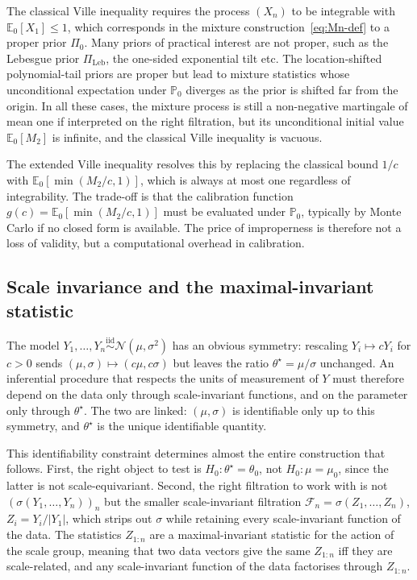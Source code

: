 \documentclass{article}%
\newcommand{\E}{\mathbb{E}}
\newcommand{\1}{\mathbf{1}}
\begin{document}
The classical Ville inequality requires the process
\((X_n)\) to be integrable with \(\E_0[X_1]\leq 1\), which corresponds
in the mixture construction~\eqref{eq:Mn-def} to a proper prior \(\Pi_0\). Many priors of practical interest are not proper, such as the Lebesgue prior \(\Pi_{\mathrm{Leb}}\), the one-sided
exponential tilt etc. The location-shifted polynomial-tail priors are
proper but lead to mixture statistics whose unconditional expectation
under \(\mathbb{P}_0\) diverges as the prior is shifted far from the origin. In all these cases, the mixture process is still a non-negative
martingale of mean one if interpreted on the right filtration, but its
unconditional initial value \(\E_0[M_2]\) is infinite, and the
classical Ville inequality is vacuous.

The extended Ville inequality \citep{wang2025extended} resolves this by replacing the classical bound \(1/c\) with \(\E_0[\min(M_2/c,1)]\),
which is always at most one regardless of integrability. The trade-off
is that the calibration function \(g(c)=\E_0[\min(M_2/c,1)]\) must be
evaluated under \(\mathbb{P}_0\), typically by Monte Carlo if no closed form is available. The price of improperness is therefore not a loss of
validity, but a computational overhead in calibration.

\subsection{Scale invariance and the maximal-invariant statistic}
The model \(Y_1,\ldots,Y_n\stackrel{\mathrm{iid}}{\sim}\mathcal{N}(\mu,\sigma^2)\)
has an obvious symmetry: rescaling \(Y_i\mapsto cY_i\) for \(c>0\)
sends \((\mu,\sigma)\mapsto(c\mu,c\sigma)\) but leaves the ratio
\(\theta^\star=\mu/\sigma\) unchanged. An inferential procedure that
respects the units of measurement of \(Y\) must therefore depend on
the data only through scale-invariant functions, and on the parameter
only through \(\theta^\star\). The two are linked: \((\mu,\sigma)\) is
identifiable only up to this symmetry, and \(\theta^\star\) is the
unique identifiable quantity.

This identifiability constraint determines almost the entire
construction that follows. First, the right object to test is
\(H_0:\theta^\star=\theta_0\), not \(H_0:\mu=\mu_0\), since the latter
is not scale-equivariant. Second, the right filtration to work with is
not \((\sigma(Y_1,\ldots,Y_n))_n\) but the smaller scale-invariant
filtration \(\mathcal{F}_n=\sigma(Z_1,\ldots,Z_n)\), \(Z_i=Y_i/|Y_1|\),
which strips out \(\sigma\) while retaining every scale-invariant
function of the data. The statistics \(Z_{1:n}\) are a maximal-invariant statistic for the action of the scale group, meaning that two data vectors give the same \(Z_{1:n}\) iff they are scale-related, and any scale-invariant function of the data factorises through \(Z_{1:n}\).
\end{document}
